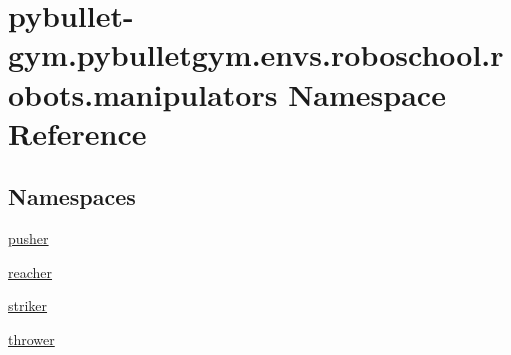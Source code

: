 \hypertarget{namespacepybullet-gym_1_1pybulletgym_1_1envs_1_1roboschool_1_1robots_1_1manipulators}{}\section{pybullet-\/gym.pybulletgym.\+envs.\+roboschool.\+robots.\+manipulators Namespace Reference}
\label{namespacepybullet-gym_1_1pybulletgym_1_1envs_1_1roboschool_1_1robots_1_1manipulators}
\subsection*{Namespaces}
\begin{DoxyCompactItemize}
\item 
 \hyperlink{namespacepybullet-gym_1_1pybulletgym_1_1envs_1_1roboschool_1_1robots_1_1manipulators_1_1pusher}{pusher}
\item 
 \hyperlink{namespacepybullet-gym_1_1pybulletgym_1_1envs_1_1roboschool_1_1robots_1_1manipulators_1_1reacher}{reacher}
\item 
 \hyperlink{namespacepybullet-gym_1_1pybulletgym_1_1envs_1_1roboschool_1_1robots_1_1manipulators_1_1striker}{striker}
\item 
 \hyperlink{namespacepybullet-gym_1_1pybulletgym_1_1envs_1_1roboschool_1_1robots_1_1manipulators_1_1thrower}{thrower}
\end{DoxyCompactItemize}
